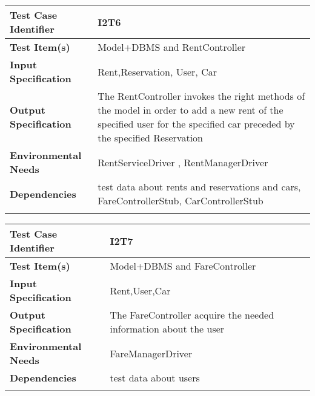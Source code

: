 \begin{center}
\begin{tabular*}
{\textwidth}
{l p{10.5cm}}

\hline
\textbf{Test Case Identifier} & I2T6 \\
\hline
\textbf{Test Item(s)} &  Model+DBMS and RentController  \\
\hline
\textbf{Input Specification} & Rent,Reservation, User, Car\\
\hline
\textbf{Output Specification} & The RentController invokes the right methods of the model in order to add a new rent of the specified user for the specified car preceded by the specified Reservation\\
\hline
\textbf{Environmental Needs} & RentServiceDriver , RentManagerDriver\\
\hline
\textbf{Dependencies} &  test data about rents and reservations and cars, FareControllerStub, CarControllerStub\\%
\hline
\newline
\newline
\end{tabular*}
\end{center}




\begin{center}
\begin{tabular*}
{\textwidth}
{l p{10.5cm}}

\hline
\textbf{Test Case Identifier} & I2T7 \\
\hline
\textbf{Test Item(s)} &  Model+DBMS and FareController  \\
\hline
\textbf{Input Specification} & Rent,User,Car\\ %
\hline
\textbf{Output Specification} & The FareController acquire the needed information about the user \\
\hline
\textbf{Environmental Needs} & FareManagerDriver\\
\hline
\textbf{Dependencies} &  test data about users\\%
\hline
\newline
\newline
\end{tabular*}
\end{center}



